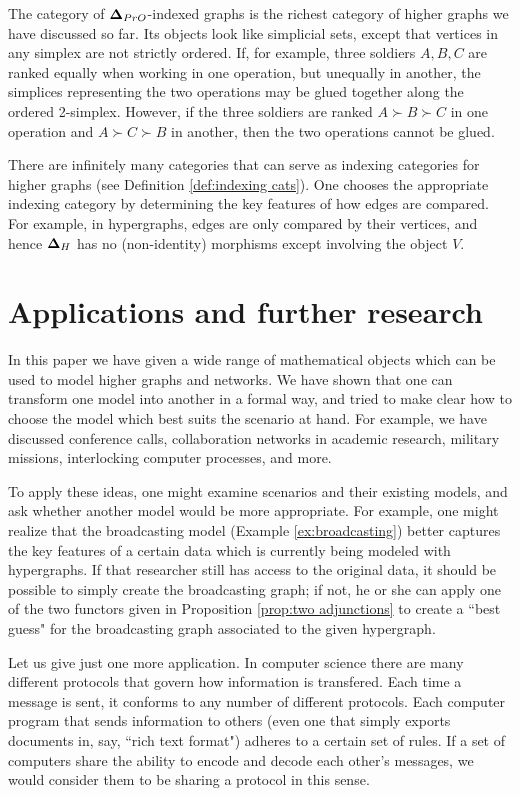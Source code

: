 \documentclass{amsart}
\def\bD{{\bf \Delta}}
\begin{document}
The category of $\bD_{PrO}$-indexed graphs is the richest category of higher graphs we have discussed so far.  Its objects look like simplicial sets, except that vertices in any simplex are not strictly ordered.  If, for example, three soldiers $A,B,C$ are ranked equally when working in one operation, but unequally in another, the simplices representing the two operations may be glued together along the ordered 2-simplex.  However, if the three soldiers are ranked $A\succ B\succ C$ in one operation and $A\succ C\succ B$ in another, then the two operations cannot be glued.

There are infinitely many categories that can serve as indexing categories for higher graphs (see Definition \ref{def:indexing cats}).  One chooses the appropriate indexing category by determining the key features of how edges are compared.  For example, in hypergraphs, edges are only compared by their vertices, and hence $\bD_H$ has no (non-identity) morphisms except involving the object $V$.  

\section{Applications and further research}\label{sec:apps}

In this paper we have given a wide range of mathematical objects which can be used to model higher graphs and networks.  We have shown that one can transform one model into another in a formal way, and tried to make clear how to choose the model which best suits the scenario at hand.  For example, we have discussed conference calls, collaboration networks in academic research, military missions, interlocking computer processes, and more.

To apply these ideas, one might examine scenarios and their existing models, and ask whether another model would be more appropriate.  For example, one might realize that the broadcasting model (Example \ref{ex:broadcasting}) better captures the key features of a certain data which is currently being modeled with hypergraphs.  If that researcher still has access to the original data, it should be possible to simply create the broadcasting graph; if not, he or she can apply one of the two functors given in Proposition \ref{prop:two adjunctions} to create a ``best guess" for the broadcasting graph associated to the given hypergraph.

Let us give just one more application.  In computer science there are many different protocols that govern how information is transfered.  Each time a message is sent, it conforms to any number of different protocols.  Each computer program that sends information to others (even one that simply exports documents in, say, ``rich text format") adheres to a certain set of rules.  If a set of computers share the ability to encode and decode each other's messages, we would consider them to be sharing a protocol in this sense.  
\end{document}
